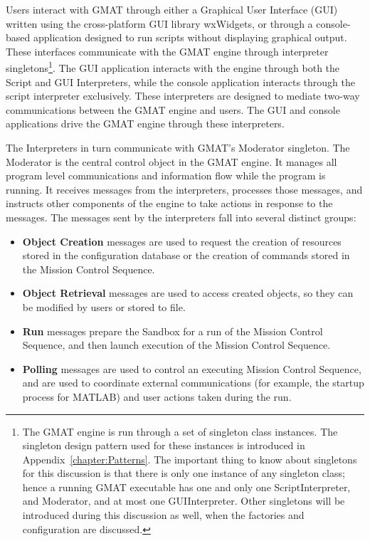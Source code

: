 Users interact with GMAT through either a Graphical User Interface (GUI) written using the
cross-platform GUI library wxWidgets, or through a console-based application designed to
run scripts without displaying graphical output.  These interfaces communicate with the GMAT engine
through interpreter singletons\footnote{The GMAT
engine is run through a set of singleton class instances.  The singleton design pattern used for
these instances is introduced in Appendix~\ref{chapter:Patterns}.  The important thing to know about
singletons for this discussion is that there is only one instance of any singleton class; hence a
running GMAT executable has one and only one ScriptInterpreter, and Moderator, and at most one
GUIInterpreter.  Other singletons will be introduced during this discussion as well, when the
factories and configuration are discussed.}.  The GUI application interacts with the engine through
both the Script and GUI Interpreters, while the console application interacts through the script
interpreter exclusively.  These interpreters are designed to mediate two-way communications between
the GMAT engine and users.   The GUI and console applications drive the GMAT engine through these
interpreters.

The Interpreters in turn communicate with GMAT's Moderator singleton.  The Moderator is the central
control object in the GMAT engine.  It manages all program level communications and information flow
while the program is running.  It receives messages from the interpreters, processes those messages,
and instructs other components of the engine to take actions in response to the messages.  The
messages sent by the interpreters fall into several distinct groups:

\begin{itemize}
\item\textbf{Object Creation} messages are used to request the creation of resources stored in the
configuration database or the creation of commands stored in the Mission Control Sequence.
\item\textbf{Object Retrieval} messages are used to access created objects, so they can be modified
by users or stored to file.
\item\textbf{Run} messages prepare the Sandbox for a run of the Mission Control Sequence, and then
launch execution of the Mission Control Sequence.
\item\textbf{Polling} messages are used to control an executing Mission Control Sequence, and are
used to coordinate external communications (for example, the startup process for MATLAB) and user
actions taken during the run.
\end{itemize}

